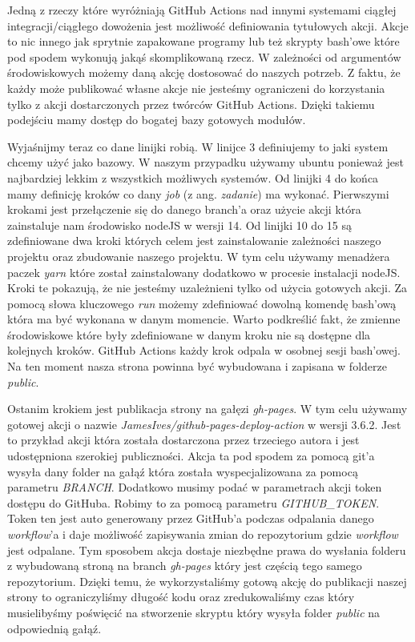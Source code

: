 \par
Jedną z rzeczy które wyróżniają GitHub Actions nad innymi systemami ciągłej integracji/ciągłego dowożenia jest możliwość definiowania tytułowych akcji. Akcje to nic innego jak sprytnie zapakowane programy lub też skrypty bash'owe które pod spodem wykonują jakąś skomplikowaną rzecz. W zależności od argumentów środowiskowych możemy daną akcję dostosować do naszych potrzeb. Z faktu, że każdy może publikować własne akcje nie jesteśmy ograniczeni do korzystania tylko z akcji dostarczonych przez twórców GitHub Actions. Dzięki takiemu podejściu mamy dostęp do bogatej bazy gotowych modułów.
\par
Wyjaśnijmy teraz co dane linijki robią. W linijce 3 definiujemy to jaki system chcemy użyć jako bazowy. W naszym przypadku używamy ubuntu ponieważ jest najbardziej lekkim z wszystkich możliwych systemów. Od linijki 4 do końca mamy definicję kroków co dany \textit{job} (z ang. \textit{zadanie}) ma wykonać. Pierwszymi krokami jest przełączenie się do danego branch'a oraz użycie akcji która zainstaluje nam środowisko nodeJS w wersji 14. Od linijki 10 do 15 są zdefiniowane dwa kroki których celem jest zainstalowanie zależności naszego projektu oraz zbudowanie naszego projektu. W tym celu używamy menadżera paczek \textit{yarn} które został zainstalowany dodatkowo w procesie instalacji nodeJS. Kroki te pokazują, że nie jesteśmy uzależnieni tylko od użycia gotowych akcji. Za pomocą słowa kluczowego \textit{run} możemy zdefiniować dowolną komendę bash'ową która ma być wykonana w danym momencie. Warto podkreślić fakt, że zmienne środowiskowe które były zdefiniowane w danym kroku nie są dostępne dla kolejnych kroków. GitHub Actions każdy krok odpala w osobnej sesji bash'owej. Na ten moment nasza strona powinna być wybudowana i zapisana w folderze \textit{public}.
\par
Ostanim krokiem jest publikacja strony na gałęzi \textit{gh-pages}. W tym celu używamy gotowej akcji o nazwie \textit{JamesIves/github-pages-deploy-action} w wersji 3.6.2. Jest to przykład akcji która została dostarczona przez trzeciego autora i jest udostępniona szerokiej publiczności. Akcja ta pod spodem za pomocą git'a wysyła dany folder na gałąź która została wyspecjalizowana za pomocą parametru \textit{BRANCH}. Dodatkowo musimy podać w parametrach akcji token dostępu do GitHuba. Robimy to za pomocą parametru \textit{GITHUB\_TOKEN}. Token ten jest auto generowany przez GitHub'a podczas odpalania danego \textit{workflow}'a i daje możliwość zapisywania zmian do repozytorium gdzie \textit{workflow} jest odpalane. Tym sposobem akcja dostaje niezbędne prawa do wysłania folderu z wybudowaną stroną na branch \textit{gh-pages} który jest częścią tego samego repozytorium. Dzięki temu, że wykorzystaliśmy gotową akcję do publikacji naszej strony to ograniczyliśmy długość kodu oraz zredukowaliśmy czas który musielibyśmy poświęcić na stworzenie skryptu który wysyła folder \textit{public} na odpowiednią gałąź.
